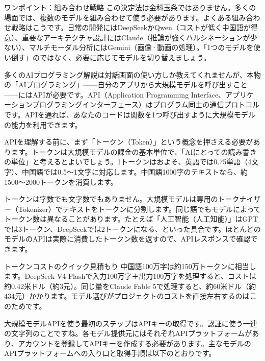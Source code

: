 \begin{tcbinfo}{ワンポイント：組み合わせ戦略}
この決定法は金科玉条ではありません。多くの場面では、複数のモデルを組み合わせて使う必要があります。よくある組み合わせ戦略はこうです。日常の開発にはDeepSeekかQwen（コストが低く中国語が得意）、重要なアーキテクチャ設計にはClaude（推論が強くハルシネーションが少ない）、マルチモーダル分析にはGemini（画像·動画の処理）。「1つのモデルを使い倒す」のではなく、必要に応じてモデルを切り替えましょう。

\end{tcbinfo}


多くのAIプログラミング解説は対話画面の使い方しか教えてくれませんが、本物の「AIプログラミング」——自分のアプリから大規模モデルを呼び出すこと——にはAPIが必要です。API（Application Programming Interface、アプリケーションプログラミングインターフェース）はプログラム同士の通信プロトコルです。APIを通れば、あなたのコードは関数を1つ呼び出すように大規模モデルの能力を利用できます。


APIを理解する前に、まず「トークン（Token）」という概念を押さえる必要があります。トークンは大規模モデルの課金の基本単位で、「AIにとっての読み書きの単位」と考えるとよいでしょう。1トークンはおよそ、英語では0.75単語（4文字）、中国語では0.5〜1文字に対応します。中国語1000字のテキストなら、約1500〜2000トークンを消費します。

トークンは字数でも文字数でもありません。大規模モデルは専用のトークナイザー（Tokenizer）でテキストをトークンに分割します。同じ語でもモデルによってトークン数は異なることがあります。たとえば「人工智能（人工知能）」はGPTでは3トークン、DeepSeekでは2トークンになる、といった具合です。ほとんどのモデルのAPIは実際に消費したトークン数を返すので、APIレスポンスで確認できます。

\begin{tcbinfo}{トークンコストのクイック見積もり}
中国語100万字は約150万トークンに相当します。DeepSeek V4 Flashで入力100万字＋出力100万字を処理すると、コストは約0.42米ドル（約3元）。同じ量をClaude Fable 5で処理すると、約60米ドル（約434元）かかります。モデル選びがプロジェクトのコストを直接左右するのはこのためです。

\end{tcbinfo}


大規模モデルAPIを使う最初のステップはAPIキーの取得です。認証に使う一連の文字列のことですね。各モデル提供元にはそれぞれAPIプラットフォームがあり、アカウントを登録してAPIキーを作成する必要があります。主なモデルのAPIプラットフォームへの入り口と取得手順は以下のとおりです。

